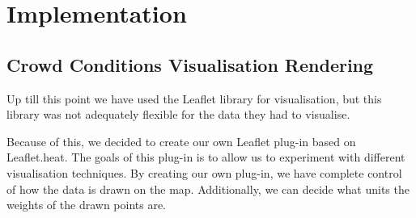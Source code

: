 \section{Implementation}

\subsection{Crowd Conditions Visualisation Rendering}\label{sec:own_leaflet_plugin}
Up till this point we have used the Leaflet library for visualisation, but this library was not adequately flexible for the data they had to visualise.

Because of this, we decided to create our own Leaflet plug-in based on Leaflet.heat. The goals of this plug-in is to allow us to experiment with different visualisation techniques. By creating our own plug-in, we have complete control of how the data is drawn on the map. Additionally, we can decide what units the weights of the drawn points are.



